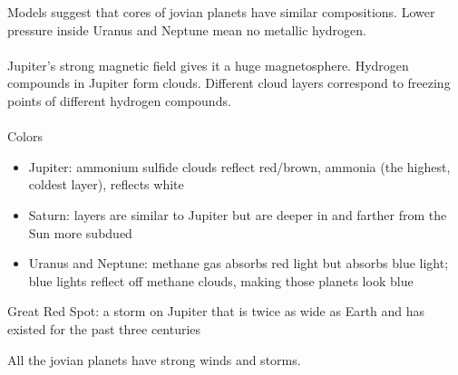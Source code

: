 \documentclass[12pt]{article}
\begin{document}
Models suggest that cores of jovian planets have similar compositions. Lower pressure inside Uranus and Neptune mean no metallic hydrogen. \\~\\
Jupiter's strong magnetic field gives it a huge magnetosphere. Hydrogen compounds in Jupiter form clouds. Different cloud layers correspond to freezing points of different hydrogen compounds. \\~\\
Colors \begin{itemize} 
\item Jupiter: ammonium sulfide clouds reflect red/brown, ammonia (the highest, coldest layer), reflects white 
\item Saturn: layers are similar to Jupiter but are deeper in and farther from the Sun  more subdued 
\item Uranus and Neptune: methane gas absorbs red light but absorbs blue light; blue lights reflect off methane clouds, making those planets look blue \end{itemize} 
\begin{definition} Great Red Spot: a storm on Jupiter that is twice as wide as Earth and has existed for the past three centuries \end{definition} 
All the jovian planets have strong winds and storms. 
\end{document}
